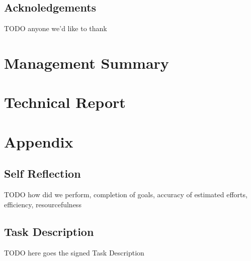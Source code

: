 \documentclass[a4paper]{report}
\begin{document}
\chapter*{Acknoledgements}
TODO anyone we'd like to thank

\tableofcontents
\listoffigures
\listoftables
\lstlistoflistings

\pagebreak
{}
\setcounter{page}{1}

\part{Management Summary}\label{part:mgmtsummary}


\part{Technical Report}







\printbibliography

\appendix
\part{Appendix}
\chapter{Self Reflection}
TODO how did we perform, completion of goals, accuracy of estimated efforts, efficiency, resourcefulness

\chapter{Task Description}\label{ch:task-desc}
TODO here goes the signed Task Description\\
%

\end{document}
